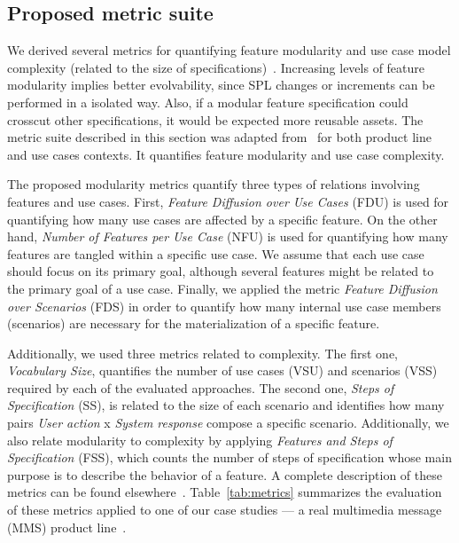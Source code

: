 \documentclass[times, 11pt,twocolumn]{article}
\begin{document}
\subsection{Proposed metric suite}\label{sub:metrics}

We derived several metrics for quantifying feature modularity and use case model
complexity (related to the size of specifications)~\cite{Bonifacio:2008aa}.
Increasing levels of feature modularity implies better evolvability, since SPL
changes or increments can be performed in a isolated way. Also, if a modular
feature specification could crosscut other specifications, it would be expected
more reusable assets. The metric suite described in this section was adapted
from~\cite{Garcia:2005aa} for both product line and use cases contexts. It quantifies 
feature modularity and use case complexity. 

The proposed modularity metrics quantify three types of relations involving
features and use cases. First, \emph{Feature Diffusion over Use Cases} (FDU) is
used for quantifying how many use cases are affected by a specific feature. On
the other hand, \emph{Number of Features per Use Case} (NFU) is used for
quantifying how many features are tangled within a specific use case. We assume
that each use case should focus on its primary goal, although several features
might be related to the primary goal of a use case. Finally, we applied the
metric \emph{Feature Diffusion over Scenarios} (FDS) in order to quantify how
many internal use case members (scenarios) are necessary for the materialization
of a specific feature.
 
Additionally, we used three metrics related to complexity. The first one,
\emph{Vocabulary Size}, quantifies the number of use cases (VSU) and scenarios
(VSS) required by each of the evaluated approaches. The second one, \emph{Steps
of Specification} (SS), is related to the size of each scenario and identifies
how many pairs \emph{User action} x \emph{System response} compose a specific
scenario. Additionally, we also relate modularity to complexity by applying
\emph{Features and Steps of Specification} (FSS), which counts the number of
steps of specification whose main purpose is to describe the behavior of a
feature. A complete description of these metrics can be found
elsewhere~\cite{Bonifacio:2008aa}.
Table~\ref{tab:metrics} summarizes the evaluation of these metrics applied to
one of our case studies --- a real multimedia message (MMS) product
line~\cite{Bonifacio:2008aa}. 
\end{document}

